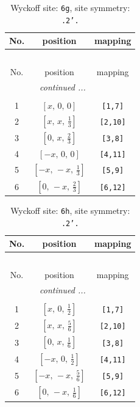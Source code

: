 \documentclass[fleqn,8pt]{jsarticle}
\begin{document}
\renewcommand{\arraystretch}{1.2}
\begin{longtable}{ccc}
\caption{Wyckoff site: {\tt 6g}, site symmetry: {\tt .2'.}}
 \\
 \hline \hline
No. & position & mapping \\ \hline \endfirsthead

\multicolumn{2}{l}{\tablename\ \thetable{}} \\
 \hline \hline
No. & position & mapping \\ \hline \endhead

 \hline \hline
\multicolumn{2}{r}{\footnotesize\it continued ...} \\ \endfoot

 \hline \hline
\multicolumn{2}{r}{} \\ \endlastfoot

1 & $\left[ x,\, 0,\, 0 \right]$ & {\tt [1,7]} \\ \hline
2 & $\left[ x,\, x,\, \frac{1}{3} \right]$ & {\tt [2,10]} \\ \hline
3 & $\left[ 0,\, x,\, \frac{2}{3} \right]$ & {\tt [3,8]} \\ \hline
4 & $\left[ - x,\, 0,\, 0 \right]$ & {\tt [4,11]} \\ \hline
5 & $\left[ - x,\, - x,\, \frac{1}{3} \right]$ & {\tt [5,9]} \\ \hline
6 & $\left[ 0,\, - x,\, \frac{2}{3} \right]$ & {\tt [6,12]} \\
\end{longtable}
\renewcommand{\arraystretch}{1.2}
\begin{longtable}{ccc}
\caption{Wyckoff site: {\tt 6h}, site symmetry: {\tt .2'.}}
 \\
 \hline \hline
No. & position & mapping \\ \hline \endfirsthead

\multicolumn{2}{l}{\tablename\ \thetable{}} \\
 \hline \hline
No. & position & mapping \\ \hline \endhead

 \hline \hline
\multicolumn{2}{r}{\footnotesize\it continued ...} \\ \endfoot

 \hline \hline
\multicolumn{2}{r}{} \\ \endlastfoot

1 & $\left[ x,\, 0,\, \frac{1}{2} \right]$ & {\tt [1,7]} \\ \hline
2 & $\left[ x,\, x,\, \frac{5}{6} \right]$ & {\tt [2,10]} \\ \hline
3 & $\left[ 0,\, x,\, \frac{1}{6} \right]$ & {\tt [3,8]} \\ \hline
4 & $\left[ - x,\, 0,\, \frac{1}{2} \right]$ & {\tt [4,11]} \\ \hline
5 & $\left[ - x,\, - x,\, \frac{5}{6} \right]$ & {\tt [5,9]} \\ \hline
6 & $\left[ 0,\, - x,\, \frac{1}{6} \right]$ & {\tt [6,12]} \\
\end{longtable}
\end{document}
